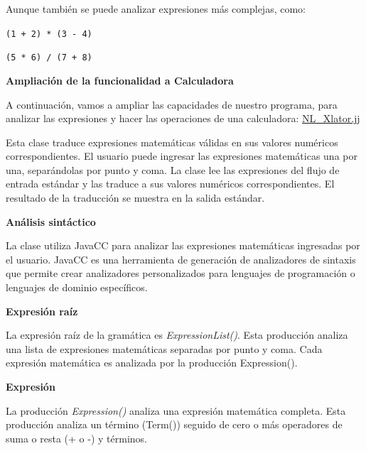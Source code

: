 Aunque también se puede analizar expresiones más complejas, como:
\begin{center}
	\lstinline|(1 + 2) * (3 - 4)|

	\lstinline|(5 * 6) / (7 + 8)|
\end{center}

\phantom{text}

\noindent \textbf{Ampliación de la funcionalidad a Calculadora}

\phantom{text}

\noindent A continuación, vamos a ampliar las capacidades de nuestro programa, para analizar las expresiones y hacer las operaciones de una calculadora: \hyperref[sec:nlxlator]{NL\_Xlator.jj}

%

Esta clase traduce expresiones matemáticas válidas en sus valores numéricos correspondientes. El usuario puede ingresar las expresiones matemáticas una por una, separándolas por punto y coma. La clase lee las expresiones del flujo de entrada estándar y las traduce a sus valores numéricos correspondientes. El resultado de la traducción se muestra en la salida estándar.

\phantom{text}

\noindent \textbf{Análisis sintáctico}

\phantom{text}

\noindent La clase utiliza JavaCC para analizar las expresiones matemáticas ingresadas por el usuario. JavaCC es una herramienta de generación de analizadores de sintaxis que permite crear analizadores personalizados para lenguajes de programación o lenguajes de dominio específicos.

\phantom{text}

\noindent \textbf{Expresión raíz}

\phantom{text}

\noindent La expresión raíz de la gramática es \textit{ExpressionList()}. Esta producción analiza una lista de expresiones matemáticas separadas por punto y coma. Cada expresión matemática es analizada por la producción Expression().

\phantom{text}

\noindent \textbf{Expresión}

\phantom{text}

\noindent La producción \textit{Expression()} analiza una expresión matemática completa. Esta producción analiza un término (Term()) seguido de cero o más operadores de suma o resta (+ o -) y términos.

